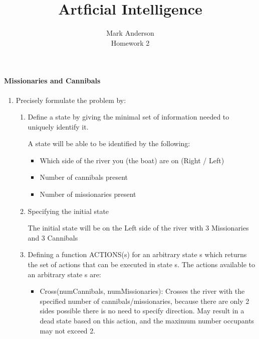 \documentclass[12pt]{article}
\begin{document}
 
\title{Artficial Intelligence} 
\author{Mark Anderson\\ 
Homework 2} 
 
\maketitle
 
 
\paragraph{Missionaries and Cannibals}
\begin{enumerate}

  \item Precisely formulate the problem by:\par
  \begin{enumerate}
    \item Define a state by giving the minimal set of information needed to uniquely identify it.\par
      A state will be able to be identified by the following: \par
      \begin{itemize}
        \item Which side of the river you (the boat) are on (Right / Left)
        \item Number of cannibals present
        \item Number of missionaries present
      \end{itemize}
    \item Specifying the initial state\par
    The initial state will be on the Left side of the river with 3 Missionaries and 3 Cannibals

    \item Defining a function ACTIONS(s) for an arbitrary state s which returns the set of actions that can be executed in state s.
    The actions available to an arbitrary state s are:
      \begin{itemize}
        \item Cross(numCannibals, numMissionaries): Crosses the river with the specified number of cannibals/missionaries, because there are only 2 sides possible there is no need to specify direction.  May result in a dead state based on this action, and the maximum number occupants may not exceed 2.
      \end{itemize}


\end{enumerate}
\end{enumerate}
\end{document}
